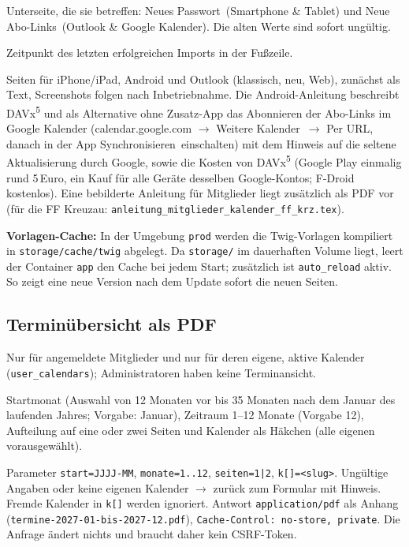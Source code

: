 \documentclass[a4paper,fontsize=10pt]{scrartcl}
\newcommand{\code}[1]{\texttt{#1}}
\begin{document}
\begin{description}[style=nextline, leftmargin=1.2cm]
    Unterseite, die sie betreffen: \glqq Neues Passwort\grqq\ (Smartphone
    \& Tablet) und \glqq Neue Abo-Links\grqq\ (Outlook \& Google
    Kalender). Die alten Werte sind sofort ungültig.
  \item[Betriebsinformation]
    Zeitpunkt des letzten erfolgreichen Imports in der Fußzeile.
  \item[Anleitungen]
    Seiten für iPhone/iPad, Android und Outlook (klassisch, neu, Web),
    zunächst als Text, Screenshots folgen nach Inbetriebnahme. Die
    Android-Anleitung beschreibt DAVx\textsuperscript{5} und als Alternative
    ohne Zusatz-App das Abonnieren der Abo-Links im Google Kalender
    (calendar.google.com $\rightarrow$ \glqq Weitere Kalender\grqq\
    $\rightarrow$ \glqq Per URL\grqq, danach in der App
    \glqq Synchronisieren\grqq\ einschalten) mit dem Hinweis auf die
    seltene Aktualisierung durch Google, sowie die Kosten von
    DAVx\textsuperscript{5} (Google Play einmalig rund 5\,Euro, ein Kauf für
    alle Geräte desselben Google-Kontos; F-Droid kostenlos). Eine
    bebilderte Anleitung für Mitglieder liegt zusätzlich als PDF vor
    (für die FF Kreuzau: \code{anleitung\_mitglieder\_kalender\_ff\_krz.tex}).
\end{description}

\textbf{Vorlagen-Cache:} In der Umgebung \code{prod} werden die
Twig-Vorlagen kompiliert in \code{storage/cache/twig} abgelegt. Da
\code{storage/} im dauerhaften Volume liegt, leert der Container \code{app}
den Cache bei jedem Start; zusätzlich ist \code{auto\_reload} aktiv. So zeigt
eine neue Version nach dem Update sofort die neuen Seiten.

\subsection{Terminübersicht als PDF}\label{sec:pdf}

Nur für angemeldete Mitglieder und nur für deren eigene, aktive Kalender
(\code{user\_calendars}); Administratoren haben keine Terminansicht.

\begin{description}[style=nextline, leftmargin=1.2cm]
  \item[Formular \code{GET /terminuebersicht}]
    Startmonat (Auswahl von 12 Monaten vor bis 35 Monaten nach dem Januar des
    laufenden Jahres; Vorgabe: Januar), Zeitraum 1--12 Monate (Vorgabe 12),
    Aufteilung auf eine oder zwei Seiten und Kalender als Häkchen (alle
    eigenen vorausgewählt).
  \item[Download \code{GET /terminuebersicht.pdf}]
    Parameter \code{start=JJJJ-MM}, \code{monate=1..12}, \code{seiten=1|2},
    \code{k[]=<slug>}. Ungültige Angaben oder keine eigenen Kalender
    $\rightarrow$ zurück zum Formular mit Hinweis. Fremde Kalender in
    \code{k[]} werden ignoriert. Antwort \code{application/pdf} als Anhang
    (\code{termine-2027-01-bis-2027-12.pdf}), \code{Cache-Control: no-store,
    private}. Die Anfrage ändert nichts und braucht daher kein CSRF-Token.
\end{description}
\end{document}
